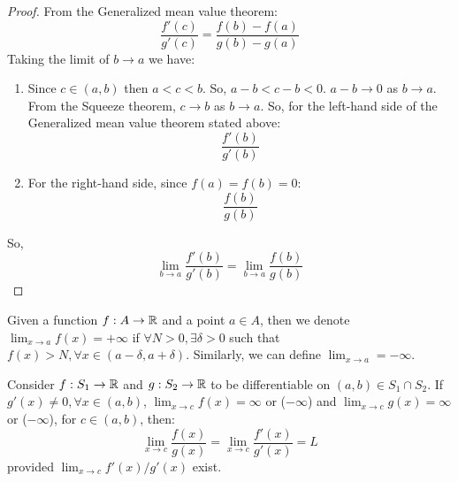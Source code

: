 \begin{proof}
    From the Generalized mean value theorem:
    \begin{equation*}
        \frac{f'(c)}{g'(c)} = \frac{f(b) - f(a)}{g(b) - g(a)}
    \end{equation*}
    Taking the limit of $b \to a$ we have:
    \begin{enumerate}
        \item Since $c \in (a,b)$ then $a < c < b$. So, $a - b < c - b < 0$. $a - b \to 0$ as $ b \to a$. From the Squeeze theorem, $c \to b$ as $b \to a$. So, for the left-hand side of the Generalized mean value theorem stated above:
            \begin{equation*}
                \frac{f'(b)}{g'(b)}
            \end{equation*}
        \item For the right-hand side, since $f(a) = f(b) = 0$:
            \begin{equation*}
                \frac{f(b)}{g(b)}
            \end{equation*}
    \end{enumerate}
    So, 
    \begin{equation*}
        \lim \limits_{b \to a} \frac{f'(b)}{g'(b)} = \lim \limits_{b \to a} \frac{f(b)}{g(b)}
    \end{equation*}
\end{proof}

\begin{definition}
    Given a function $f: A \to \mathbb{R}$ and a point $a \in A$, then we denote $\lim_{x \to a} f(x) = +\infty$ if $\forall N > 0, \exists \delta > 0$ such that $f(x) > N, \forall x \in (a - \delta, a + \delta)$.
    Similarly, we can define $\lim_{x \to a} = - \infty$.
\end{definition}

\begin{theorem}
    Consider $f: S_1 \to \mathbb{R}$ and $g: S_2 \to \mathbb{R}$ to be differentiable on $(a,b) \in S_1 \cap S_2$. If $g'(x) \neq 0, \forall x \in (a,b)$, $\lim_{x \to c} f(x)= \infty$ or ($-\infty$) and $\lim_{x \to c} g(x) = \infty$ or ($-\infty$), for $c \in (a,b)$, then:
    \begin{equation*}
        \lim \limits_{x \to c} \frac{f(x)}{g(x)} = \lim \limits_{x \to c} \frac{f'(x)}{g'(x)} = L
    \end{equation*}
    provided $\lim_{x \to c} f'(x)/g'(x)$ exist.
\end{theorem}

